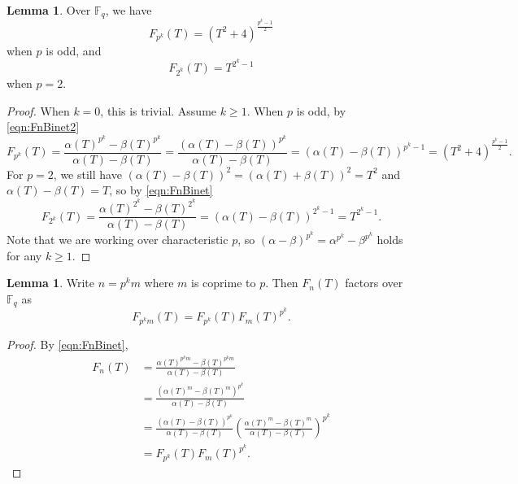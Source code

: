 \documentclass[letterpaper, 10pt]{article}
\newcommand{\bF}{\mathbb{F}}
\newcommand{\1}{\mathds{1}}	%
\theoremstyle{definition}
\newtheorem{lemma}[theorem]{Lemma}
\theoremstyle{remark}
\begin{document}
\begin{lemma}
\label{lem:Fpk}
    Over $\bF_q$, we have
    \begin{equation}
    \label{eqn:Fpkodd}
        F_{p^k}(T) = (T^2 + 4)^{\frac{p^k - 1}{2}}
    \end{equation}
    when \(p\) is odd, and
    \begin{equation}
    \label{eqn:Fpkeven}
        F_{2^k}(T) = T^{2^k - 1}
    \end{equation}
    when \(p = 2\).
\end{lemma}
\begin{proof}
    When $k = 0$, this is trivial. Assume $k \ge 1$.
    When \(p\) is odd, by \eqref{eqn:FnBinet2}
    \[
        F_{p^k}(T) = \frac{\alpha(T)^{p^k} - \beta(T)^{p^k}}{\alpha(T) - \beta(T)} = \frac{(\alpha(T) - \beta(T))^{p^k}}{\alpha(T) - \beta(T)} = (\alpha(T) - \beta(T))^{p^{k} -1} = (T^2 + 4)^{\frac{p^k -1}{2}}.
    \]
    For \(p = 2\), we still have \((\alpha(T) - \beta(T))^2 = (\alpha(T) + \beta(T))^2 = T^2\) and \(\alpha(T) - \beta(T) = T\), so by \eqref{eqn:FnBinet}
    \[
        F_{2^k}(T) = \frac{\alpha(T)^{2^k} - \beta(T)^{2^k}}{\alpha(T) - \beta(T)} = (\alpha(T) - \beta(T))^{2^k - 1} = T^{2^k - 1}.
    \]
    Note that we are working over characteristic $p$, so $(\alpha - \beta)^{p^k} = \alpha^{p^k} - \beta^{p^k}$ holds for any $k \ge 1$.
\end{proof}

\begin{lemma}
\label{lem:Fpkm}
    Write \(n = p^k m\) where \(m\) is coprime to \(p\). Then \(F_n(T)\) factors over \(\bF_q\) as
    \begin{equation}
        F_{p^k m}(T) = F_{p^k}(T) F_m(T)^{p^k}.
    \end{equation}
\end{lemma}
\begin{proof}
    By \eqref{eqn:FnBinet},
    \begin{align*}
        F_n(T) &= \frac{\alpha(T)^{p^k m} - \beta(T)^{p^k m}}{\alpha(T) - \beta(T)} \\
        &= \frac{(\alpha(T)^{m} - \beta(T)^m)^{p^k}}{\alpha(T) - \beta(T)} \\
        &= \frac{(\alpha(T) - \beta(T))^{p^k}}{\alpha(T) - \beta(T)}\left(\frac{\alpha(T)^m - \beta(T)^m}{\alpha(T) - \beta(T)}\right)^{p^k} \\
        &= F_{p^k}(T) F_m(T)^{p^k}.
    \end{align*}
\end{proof}
\end{document}
